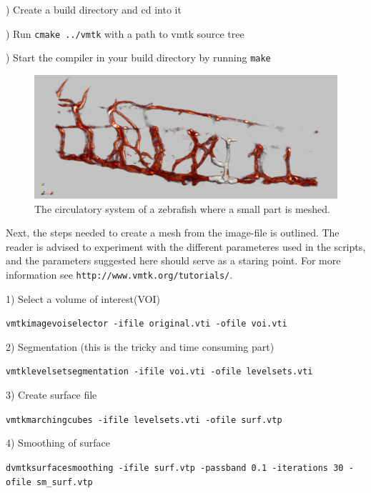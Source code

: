 \documentclass[epsfig,11pt]{article}
\begin{document}
) Create a build directory and cd into it

) Run \texttt{cmake ../vmtk} with a path to vmtk source tree

) Start the compiler in your build directory by running \texttt{make}

 \begin{figure}[h!] 
\begin{center}
  \includegraphics[scale=0.3]{overview2.png}
  \end{center}
  \caption{The circulatory system of a zebrafish where a small part is meshed.}
\end{figure}

Next, the steps needed to create a mesh from the image-file is outlined. The reader is advised to experiment with the different parameteres used in the scripts, and the parameters suggested here should serve as a staring point. For more information see \texttt{http://www.vmtk.org/tutorials/}.



1) Select a volume of interest(VOI)
\begin{framed}       
    \texttt{vmtkimagevoiselector -ifile original.vti -ofile voi.vti}
\end{framed}
2) Segmentation (this is the tricky and time consuming part)
\begin{framed}       
    \texttt{vmtklevelsetsegmentation -ifile voi.vti -ofile levelsets.vti}
\end{framed}
3) Create surface file
\begin{framed}       
    \texttt{vmtkmarchingcubes -ifile levelsets.vti -ofile surf.vtp}
\end{framed}
4) Smoothing of surface
\begin{framed}       
    \texttt{dvmtksurfacesmoothing -ifile surf.vtp -passband 0.1 -iterations 30 -ofile sm\_surf.vtp}
\end{framed}
\end{document}
